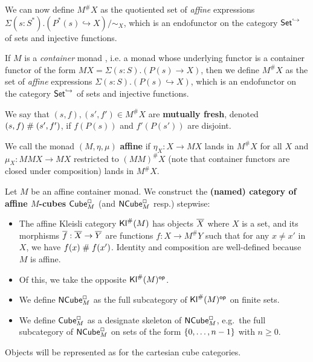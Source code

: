 \documentclass[a4paper]{article}
\begin{document}
We can now define $M^\# X$ as the quotiented set of \emph{affine} expressions $\Sigma(s : S^*).(P^*(s) \hookrightarrow X) / \sim_X$, which is an endofunctor on the category ${\mathsf{Set}}^{\hookrightarrow}$ of sets and injective functions.


If $M$ is a \emph{container} monad \cite{container-combinatorics}, i.e. a monad whose underlying functor is a container functor \cite{containers} of the form $MX = \Sigma(s : S).(P(s) \to X)$, then we define $M^\# X$ as the set of \emph{affine} expressions $\Sigma(s : S).(P(s) \hookrightarrow X)$, which is an endofunctor on the category ${\mathsf{Set}}^{\hookrightarrow}$ of sets and injective functions.

We say that $(s, f), (s', f') \in M^\# X$ are \textbf{mutually fresh}, denoted $(s, f) \mathrel{\#} (s', f')$, if $f(P(s))$ and $f'(P(s'))$ are disjoint.

We call the monad $(M, \eta, \mu)$ \textbf{affine} if $\eta_X : X \to MX$ lands in $M^\# X$ for all $X$ and $\mu_X : MMX \to MX$ restricted to $(MM)^\# X$ (note that container functors are closed under composition) lands in $M^\# X$.

\begin{definition}
Let $M$ be an affine container monad.
We construct the \textbf{(named) category of affine $M$-cubes ${\mathsf{Cube}}_M^\Box$} (and ${\mathsf{NCube}}_M^\Box$ resp.) stepwise:
\begin{itemize}
	\item The affine Kleisli category ${\mathsf{Kl}}^\#(M)$ has objects ${\overline{X}}$ where $X$ is a set, and its morphisms ${\overline{f}} : {\overline{X}} \to {\overline{Y}}$ are functions $f : X \to M^\#Y$ such that for any $x \neq x'$ in $X$, we have $f(x) \mathrel{\#} f(x')$.
	Identity and composition are well-defined because $M$ is affine.
	\item Of this, we take the opposite ${\mathsf{Kl}}^\#(M)^{\mathsf{op}}$.
		\item We define ${\mathsf{NCube}}_M^\Box$ as the full subcategory of ${\mathsf{Kl}}^\#(M)^{\mathsf{op}}$ on finite sets.
		\item We define ${\mathsf{Cube}}_M^\Box$ as a designate skeleton of ${\mathsf{NCube}}^\Box_M$, e.g.\ the full subcategory of ${\mathsf{NCube}}^\Box_M$ on sets of the form $\mathopen{}\left\{ 0, \ldots, n-1 \right\}\mathclose{}$ with $n \geq 0$.
\end{itemize}
\end{definition}
Objects will be represented as for the cartesian cube categories.
\end{document}
